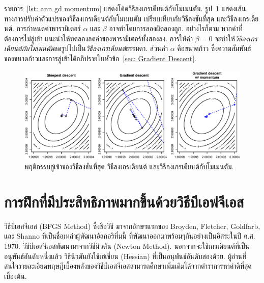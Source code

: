 รายการ~\ref{lst: ann gd momentum} แสดงโค้ดวิธีลงเกรเดียนต์กับโมเมนตัม.
รูป~\ref{fig: more ann gdm} แสดงเส้นทางการปรับค่าตัวแปรของวิธีลงเกรเดียนต์กับโมเมนตัม 
เปรียบเทียบกับวิธีลงชันที่สุด และวิธีลงเกรเดียนต์.
การกำหนดค่าพารามิเตอร์ $\alpha$ และ $\beta$ อาจทำโดยการลองผิดลองถูก\cite{Rojas1996a}.
อย่างไรก็ตาม หากค่าที่ต้องการไม่ลู่เข้า แนะนำให้ทดลองลดค่าของพารามิเตอร์ทั้งสองลง.
การให้ค่า $\beta = 0$ จะทำให้\textit{วิธีลงเกรเดียนต์กับโมเมนตัม}ลดรูปไปเป็น\textit{วิธีลงเกรเดียนต์}ธรรมดา.
ส่วนค่า $\alpha$ คือขนาดก้าว ซึ่งความสัมพันธ์ของขนาดก้าวและการลู่เข้าได้อภิปรายในหัวข้อ~\ref{sec: Gradient Descent}.



%
\begin{figure}
\begin{center}
\includegraphics[width=5.5in]{04ANNmore/gdm02.eps}
\end{center}
\caption{พฤติกรรมลู่เข้าของวิธีลงชันที่สุด วิธีลงเกรเดียนต์ และวิธีลงเกรเดียนต์กับโมเมนตัม.}
\label{fig: more ann gdm}
\end{figure}

\section{การฝึกที่มีประสิทธิภาพมากขึ้นด้วยวิธีบีเอฟจีเอส}
\label{sec: BFGS example}

วิธีบีเอสจีเอส (BFGS Method) ซึ่งชื่อวิธี มาจากอักษรแรกของ Broyden, Fletcher, Goldfarb, และ Shanno ที่เป็นชื่อเหล่าผู้พัฒนาอัลกอริทึ่มนี้ ที่พัฒนาออกมาพร้อมๆกันอย่างเป็นอิสระในปี ค.ศ. 1970. 
วิธีบีเอสจีเอสพัฒนามาจากวิธีนิวตัน (Newton Method).
นอกจากจะใช้เกรเดียนต์ที่เป็นอนุพันธ์อันดับหนึ่งแล้ว วิธีนิวตันยังใช้เฮเชี่ยน (Hessian) ที่เป็นอนุพันธ์อันดับสองด้วย.
ผู้อ่านที่สนใจรายละเอียดทฤษฎีเบื้องหลังของวิธีบีเอสจีเอสสามารถศึกษาเพิ่มเติมได้จากตำราการหาค่าดีที่สุดเบื้องต้น\cite{ChongZak2ndEd}.

